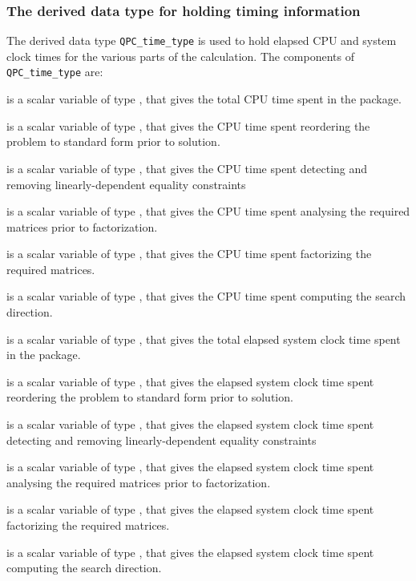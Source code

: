 \documentclass{galahad}
\newcommand{\packagename}{QPC}
\begin{document}

\subsubsection{The derived data type for holding timing 
 information}\label{typetime}
The derived data type 
{\tt \packagename\_time\_type} 
is used to hold elapsed CPU and system clock times for the various parts of 
the calculation. The components of 
{\tt \packagename\_time\_type} 
are:
\begin{description}
 is a scalar variable of type \realdp, that gives
 the total CPU time spent in the package.

 is a scalar variable of type \realdp, that gives
 the CPU time spent reordering the problem to standard form prior to solution.

 is a scalar variable of type \realdp, that gives
 the CPU time spent detecting and removing linearly-dependent equality 
 constraints

 is a scalar variable of type \realdp, that gives
 the CPU time spent analysing the required matrices prior to factorization.

 is a scalar variable of type \realdp, that gives
 the CPU time spent factorizing the required matrices.

 is a scalar variable of type \realdp, that gives
 the CPU time spent computing the search direction.

 is a scalar variable of type \realdp, that gives
 the total elapsed system clock time spent in the package.

 is a scalar variable of type \realdp, that gives
 the elapsed system clock time spent reordering the problem to standard form 
prior to solution.

 is a scalar variable of type \realdp, that 
gives  the elapsed system clock time spent detecting and removing 
linearly-dependent equality 
 constraints

 is a scalar variable of type \realdp, that gives
 the elapsed system clock time spent analysing the required matrices prior to 
factorization.

 is a scalar variable of type \realdp, that gives
 the elapsed system clock time spent factorizing the required matrices.

 is a scalar variable of type \realdp, that gives
 the elapsed system clock time spent computing the search direction.

\end{description}
\end{document}
